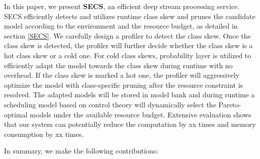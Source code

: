 \documentclass[pageno]{jpaper}
\begin{document}

In this paper, we present \textbf{SECS}, an efficient deep stream processing service. SECS efficiently detects and utilizes runtime class skew and prunes the candidate model according to the environment and the resource budget, as detailed in section \ref{SECS}. We carefully design a profiler to detect the class skew. Once the class skew is detected, the profiler will further decide whether the class skew is a hot class skew or a cold one. For cold class skews, probability layer is utilized to efficiently adapt the model towards the class skew during runtime with no overhead. If the class skew is marked a hot one, the profiler will aggressively optimize the model with class-specific pruning after the resource constraint is resolved. The adapted models will be stored in model bank and during runtime a scheduling model based on control theory will dynamically select the Pareto-optimal models under the available resource budget. Extensive evaluation shows that our system can potentially reduce the computation by xx times and memory consumption by xx times.

In summary, we make the following contributions:
\end{document}
